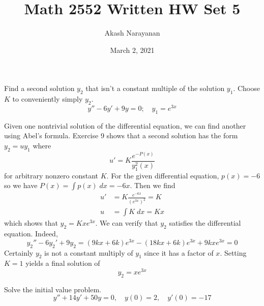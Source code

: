 \documentclass[11pt, titlepage]{article}
\title{Math 2552 Written HW Set 5}
\author{Akash Narayanan}
\date{March 2, 2021}
\begin{document}
  \maketitle

  \begin{problem}[Trench 5.1.11]
    Find a second solution \(y_{2}\) that isn't a constant multiple of the solution \(y_{1}\).
    Choose \(K\) to conveniently simply \(y_{2}\).
    \begin{equation*}
      y'' - 6y' + 9y = 0; \quad y_{1} = e^{3x}
    \end{equation*}
  \end{problem}

  \begin{solution}
    Given one nontrivial solution of the differential equation, we can find another using Abel's formula.
    Exercise 9 shows that a second solution has the form \(y_{2} = u y_{1}\) where
    \begin{equation*}
      u' = K \frac{e^{-P(x)}}{y_{1}^{2}(x)}
    \end{equation*}
    for arbitrary nonzero constant \(K\).
    For the given differential equation, \(p(x) = -6\) so we have \(P(x) = \int p(x) \; dx = -6x\).
    Then we find
    \begin{align*}
      u' &= K \frac{e^{-6x}}{(e^{3x})^{2}} = K \\
      u &= \int K \; dx = Kx
    \end{align*}
    which shows that \(y_{2} = Kx e^{3x}\).
    We can verify that \(y_{2}\) satisfies the differential equation. Indeed,
    \begin{equation*}
      y_{2}'' - 6y_{2}' + 9y_{2} = (9kx + 6k) e^{3x} - (18kx + 6k) e^{3x} + 9kxe^{3x} = 0
    \end{equation*}
    Certainly \(y_{2}\) is not a constant multiply of \(y_{1}\) since it has a factor of \(x\).
    Setting \(K = 1\) yields a final solution of
    \begin{equation*}
      y_{2} = xe^{3x}
    \end{equation*}
  \end{solution}

  \pagebreak

  \begin{problem}[Trench 5.2.13]
    Solve the initial value problem.
    \begin{equation*}
      y'' + 14y' + 50y = 0, \quad y(0) = 2, \quad y'(0) = -17
    \end{equation*}
  \end{problem}
\end{document}
